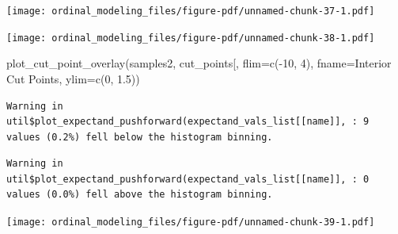 \documentclass[
  letterpaper,
  DIV=11,
  numbers=noendperiod]{scrartcl}
\newenvironment{Shaded}{\begin{snugshade}}{\end{snugshade}}
\newcommand{\AttributeTok}[1]{\textcolor[rgb]{0.40,0.45,0.13}{#1}}
\newcommand{\ControlFlowTok}[1]{\textcolor[rgb]{0.00,0.23,0.31}{#1}}
\newcommand{\DecValTok}[1]{\textcolor[rgb]{0.68,0.00,0.00}{#1}}
\newcommand{\FloatTok}[1]{\textcolor[rgb]{0.68,0.00,0.00}{#1}}
\newcommand{\FunctionTok}[1]{\textcolor[rgb]{0.28,0.35,0.67}{#1}}
\newcommand{\NormalTok}[1]{\textcolor[rgb]{0.00,0.23,0.31}{#1}}
\newcommand{\OtherTok}[1]{\textcolor[rgb]{0.00,0.23,0.31}{#1}}
\newcommand{\SpecialCharTok}[1]{\textcolor[rgb]{0.37,0.37,0.37}{#1}}
\newcommand{\StringTok}[1]{\textcolor[rgb]{0.13,0.47,0.30}{#1}}
\begin{document}
\texttt{[image: ordinal\_modeling\_files/figure-pdf/unnamed-chunk-37-1.pdf]}

\begin{Shaded}
\end{Shaded}

\texttt{[image: ordinal\_modeling\_files/figure-pdf/unnamed-chunk-38-1.pdf]}

\begin{Shaded}
\begin{Highlighting}[]
\FunctionTok{plot\_cut\_point\_overlay}\NormalTok{(samples2, }\StringTok{\textquotesingle{}cut\_points[\textquotesingle{}}\NormalTok{,}
                       \AttributeTok{flim=}\FunctionTok{c}\NormalTok{(}\SpecialCharTok{{-}}\DecValTok{10}\NormalTok{, }\DecValTok{4}\NormalTok{), }\AttributeTok{fname=}\StringTok{\textquotesingle{}Interior Cut Points\textquotesingle{}}\NormalTok{,}
                       \AttributeTok{ylim=}\FunctionTok{c}\NormalTok{(}\DecValTok{0}\NormalTok{, }\FloatTok{1.5}\NormalTok{))}
\end{Highlighting}
\end{Shaded}

\begin{verbatim}
Warning in util$plot_expectand_pushforward(expectand_vals_list[[name]], : 9
values (0.2%) fell below the histogram binning.
\end{verbatim}

\begin{verbatim}
Warning in util$plot_expectand_pushforward(expectand_vals_list[[name]], : 0
values (0.0%) fell above the histogram binning.
\end{verbatim}

\texttt{[image: ordinal\_modeling\_files/figure-pdf/unnamed-chunk-39-1.pdf]}
\end{document}
